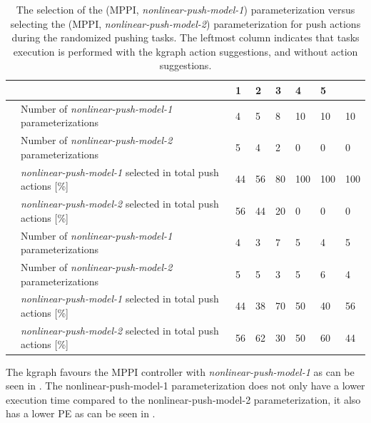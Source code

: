 \begin{table}[H]
    \caption{The selection of the (\ac{MPPI}, \textit{nonlinear-push-model-1}) parameterization versus selecting the (\ac{MPPI}, \textit{nonlinear-push-model-2}) parameterization for push actions during the randomized pushing tasks. The leftmost column indicates that tasks execution is performed with the \ac{kgraph} action suggestions, and without action suggestions.}
    \label{table:rand_push_model1_vs_model2}
    \centering
    \begin{tabular}%
      {
        >{\raggedright\arraybackslash}p{}
        >{\raggedright\arraybackslash}p{}
      |p{0.4cm}p{0.4cm}p{0.4cm}p{0.4cm}p{0.4cm}p{0.4cm}}
      \multicolumn{2}{c|}{Number of Tasks in experience} &0&1&2&3&4&5\\\toprule
      \multirow{4}{0.1\textwidth}{With \ac{kgraph} suggestions} 
      &Number of \textit{nonlinear-push-model-1} parameterizations&4&5&8&10&10&10\\
      &Number of \textit{nonlinear-push-model-2} parameterizations&5&4&2&0&0&0\\
      & \textit{nonlinear-push-model-1} selected in total push actions [\%]&44&56&80&100&100&100\\
      & \textit{nonlinear-push-model-2} selected in total push actions [\%]&56&44&20&0&0&0\\\midrule
      \multirow{4}{0.1\textwidth}{Without \ac{kgraph} suggestions} 
      &Number of \textit{nonlinear-push-model-1} parameterizations&4&3&7&5&4&5\\
      &Number of \textit{nonlinear-push-model-2} parameterizations&5&5&3&5&6&4\\
      & \textit{nonlinear-push-model-1} selected in total push actions [\%]&44&38&70&50&40&56\\
      & \textit{nonlinear-push-model-2} selected in total push actions [\%]&56&62&30&50&60&44\\
    \end{tabular}
\end{table}


The \ac{kgraph} favours the \ac{MPPI} controller with \textit{nonlinear-push-model-1} as can be seen in . The nonlinear-push-model-1 parameterization does not only have a lower execution time compared to the nonlinear-push-model-2 parameterization, it also has a lower \ac{PE} as can be seen in .

